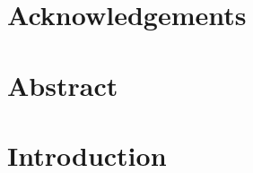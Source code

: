 \documentclass[a4paper, 11pt]{memoir}
\title{\izenburua}
\author{\egilea}
\date{\data}
\begin{document}
	
	
%

\cleardoublepage



%
%




\cleardoublepage
\frontmatter


\chapter*{Acknowledgements} \label{cha:acknowledgements}

\cleardoublepage


\chapter*{Abstract} \label{cha:abstract}

\cleardoublepage


\tableofcontents
\clearpage
\listoffigures
\clearpage
\listoftables
\clearpage
\listofalgorithms
{}



\cleardoublepage
\mainmatter
\pagestyle{ruled}

\chapter{Introduction} \label{cha:1_introduction}

\cleardoublepage
\end{document}
